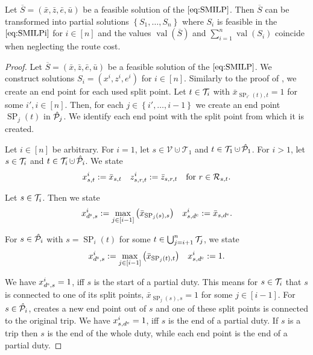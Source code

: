 \begin{theorem}
\label{thm:equivalence_SMILP_heuristic}

Let ${\overline{S}=\left(\bar{x},\bar{z},\bar{e},\bar{u}\right)}$ be a feasible solution of the $\eqref{eq:SMILP}$. Then $\overline{S}$ can be transformed into partial solutions $\left\{S_1,\dots,S_n\right\}$ where $S_i$ is feasible in the $\eqref{eq:SMILPi}$ for ${i\in[n]}$ and the values $\operatorname{val}(\overline{S})$ and ${\sum_{i=1}^n \operatorname{val}\left(S_i\right)}$ coincide when neglecting the route cost.

\end{theorem}

\begin{proof}

Let ${\overline{S}=\left(\bar{x},\bar{z},\bar{e},\bar{u}\right)}$ be a feasible solution of the $\eqref{eq:SMILP}$. We construct solutions ${S_i=\left(x^i,z^i,e^i\right)}$ for ${i\in[n]}$. Similarly to the proof of , we create an end point for each used split point. Let ${t\in\mathcal{T}_i}$ with ${\bar{x}_{\operatorname{SP}_{i'}(t),t}=1}$ for some ${i',i\in[n]}$. Then, for each ${j\in\left\{i',\dots,i-1\right\}}$ we create an end point $\operatorname{SP}_j(t)$ in $\hat{\mathcal{P}}_j$. We identify each end point with the split point from which it is created.

Let ${i\in[n]}$ be arbitrary. For ${i=1}$, let ${s\in\mathcal{V}\cupdot\mathcal{T}_1}$ and ${t\in\mathcal{T}_1\cupdot\Phat_1}$. For ${i>1}$, let ${s\in\mathcal{T}_i}$ and ${t\in\Ti\cupdot\Phat_i}$. We state
\begin{align*}
	x^i_{s,t} := \bar{x}_{s,t} && z^i_{s,r,t} := \bar{z}_{s,r,t} && \text{for } r\in\mathcal{R}_{s,t}.
\end{align*}

Let ${s\in\mathcal{T}_i}$. Then we state
\begin{align*}
	x^i_{d^{\operatorname{s}},s} := \max_{j\in[i-1]} \left(\bar{x}_{\operatorname{SP}_j(s),s}\right) && x^i_{s,d^{\operatorname{e}}} := \bar{x}_{s,d^{\operatorname{e}}}.
\end{align*}

For ${s\in\hat{\mathcal{P}}_i}$ with ${s=\operatorname{SP}_i(t)}$ for some ${t\in\bigcup_{j=i+1}^n\mathcal{T}_j}$, we state
\begin{align*}
	x^i_{d^{\operatorname{s}},s} := \max_{j\in[i-1]} \left(\bar{x}_{\operatorname{SP}_j(t),t}\right) && x^i_{s,d^{\operatorname{e}}} := 1.
\end{align*}

We have ${x^i_{d^{\operatorname{s}},s}=1}$, iff $s$ is the start of a partial duty. This means for ${s\in\mathcal{T}_i}$ that $s$ is connected to one of its split points, \ie ${\bar{x}_{\operatorname{SP}_j(s),s}=1}$ for some ${j\in[i-1]}$. For ${s\in\hat{\mathcal{P}}_i}$,  creates a new end point out of $s$ and one of these split points is connected to the original trip. We have ${x^i_{s,d^{\operatorname{e}}}=1}$, iff $s$ is the end of a partial duty. If $s$ is a trip then $s$ is the end of the whole duty, while each end point is the end of a partial duty.


\end{proof}
